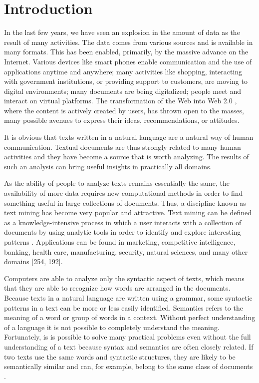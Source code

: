 \documentclass[11pt,openany,executivepaper]{book}
\begin{document}
\section{Introduction}
\setlength{\parskip}{0pt}
\setlength{\parindent}{20pt}
In the last few years, we have seen an explosion in the amount of data as the result of many activities. The data comes from various sources and is available in many formats. This has been enabled, primarily, by the massive advance on the Internet. Various devices like smart phones enable communication and the use of applications anytime and anywhere; many activities like shopping, interacting with government institutions, or providing support to customers, are moving to digital environments; many documents are being digitalized; people meet and interact on virtual platforms. The transformation of the Web into Web 2.0 \cite{26}, where the content is actively created by users, has thrown open to the masses, many possible avenues to express their ideas, recommendations, or attitudes.

It is obvious that texts written in a natural language are a natural way of human communication. Textual documents are thus strongly related to many human activities and they have become a source that is worth analyzing. The results of such an analysis can bring useful insights in practically all domains.

As the ability of people to analyze texts remains essentially the same, the availability of more data requires new computational methods in order to find something useful in large collections of documents. Thus, a discipline known as text mining has become very popular and attractive. Text mining can be defined as a knowledge-intensive process in which a user interacts with a collection of documents by using analytic tools in order to identify and explore interesting patterns \cite{87}. Applications can be found in marketing, competitive intelligence, banking, health care, manufacturing, security, natural sciences, and many other domains [254, 192].

Computers are able to analyze only the syntactic aspect of texts, which means that they are able to recognize how words are arranged in the documents. Because texts in a natural language are written using a grammar, some syntactic patterns in a text can be more or less easily identified. Semantics refers to the meaning of a word or group of words in a context. Without perfect understanding of a language it is not possible to completely understand the meaning. Fortunately, is is possible to solve many practical problems even without the full understanding of a text because syntax and semantics are often closely related. If two texts use the same words and syntactic structures, they are likely to be semantically similar and can, for example, belong to the same class of documents \cite{196}.
\end{document}
